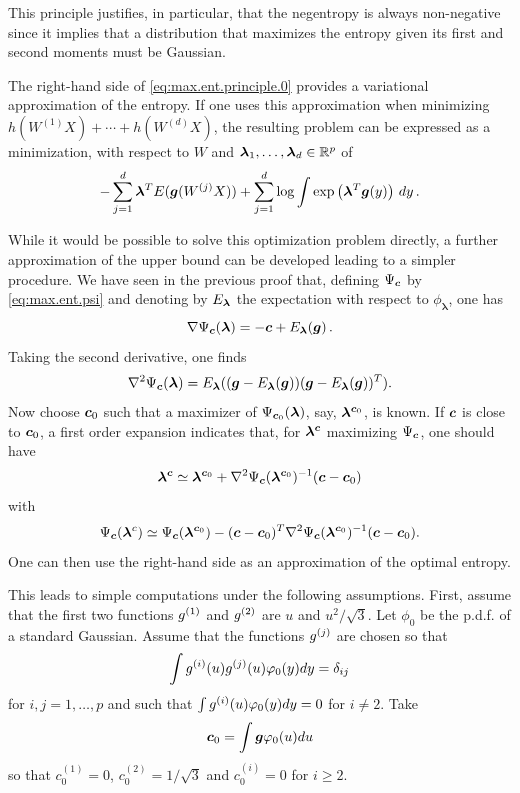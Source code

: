 \begin{remark}
This principle justifies, in particular, that the negentropy is always non-negative since it implies that a distribution that maximizes the entropy given its first and second moments must be Gaussian.  
\end{remark}

The right-hand side of \cref{eq:max.ent.principle.0} provides a variational approximation of the entropy. If one uses this approximation when minimizing 
$h(W^{(1)} X) + \cdots + h(W^{(d)} X)$, the resulting problem can be expressed as a minimization, with respect to
$W$ and $\bm\lambda_1, \ldots, \bm\lambda_d\in {\mathbb{R}}^p$ of
\[
- \sum_{j=1}^d \bm{\lambda}^T E({\bm{g}}(W^{(j)}X)) + \sum_{j=1}^d \log \int \exp\left(\bm{\lambda}^T {\bm{g}}(y)\right)\,dy\,.
\]

While it would be possible to solve this optimization problem directly,  a further approximation of the upper bound can be developed leading to a simpler procedure. We have seen in the previous proof that, defining $\Psi_{{\bm{c}}} $ by \cref{eq:max.ent.psi} and denoting by  $E_{\bm{\lambda}}$ the expectation with respect to $\phi_{\boldsymbol\lambda}$, one has
\[
\nabla \Psi_{\bm{c}}(\bm{\lambda}) = - {\bm{c}} + E_{\bm{\lambda}}({\bm{g}})\,.
\]
Taking the second derivative, one finds
\[
\nabla^2 \Psi_{\bm{c}}(\bm{\lambda}) = E_{\bm{\lambda}}(({\bm{g}}-E_{\bm{\lambda}}({\bm{g}}))({\bm{g}}-E_{\bm{\lambda}}({\bm{g}}))^T).
\]
Now choose ${\bm{c}}_{0}$ such that a maximizer of $\Psi_{{\bm{c}}_{0}}(\bm{\lambda})$, say, $\bm{\lambda}^{{\bm{c}}_{0}}$, is known. If ${\bm{c}}$ is close to ${\bm{c}}_{0}$, a first order expansion indicates that, for $\bm{\lambda}^{{\bm{c}}}$ maximizing $\Psi_{\bm{c}}$, one should have
\[
\bm{\lambda}^{{\bm{c}}} \simeq \bm{\lambda}^{{\bm{c}}_{0}} + \nabla^2 \Psi_{\bm{c}}(\bm{\lambda}^{{\bm{c}}_{0}})^{-1} ({\bm{c}} - {\bm{c}}_{0})
\]
with
\[
\Psi_{\bm{c}}(\bm{\lambda}^c)\simeq \Psi_{\bm{c}}(\bm{\lambda}^{{\bm{c}}_{0}}) - ({\bm{c}}-{\bm{c}}_{0})^T\nabla^2 \Psi_{\bm{c}}(\bm{\lambda}^{{\bm{c}}_{0}})^{-1} ({\bm{c}} - {\bm{c}}_{0}). 
\]
One can then use the right-hand side as an approximation of the optimal entropy. 

This leads to simple computations under the following assumptions. First, assume that  the first two functions $g^{(1)}$ and $g^{(2)}$ are $u$ and $u^2/\sqrt 3$. 
Let $\phi_0$ be the p.d.f. of a standard Gaussian. Assume that the functions $g^{(j)}$ are chosen so that
\[
\int g^{(i)}(u) g^{(j)}(u) \varphi_0(y) dy = \delta_{ij}
\]
for $i,j=1, \ldots, p$ and such that $\int g^{(i)}(u) \varphi_0(y) dy = 0$ for $i\neq 2$. Take
\[
{\bm{c}}_0 = \int {\bm{g}} \varphi_0(u) du
\]
so that $c^{(1)}_0=0$, $c^{(2)}_0 = 1/\sqrt 3$ and $c^{(i)}_0 = 0$ for $i\geq 2$.

